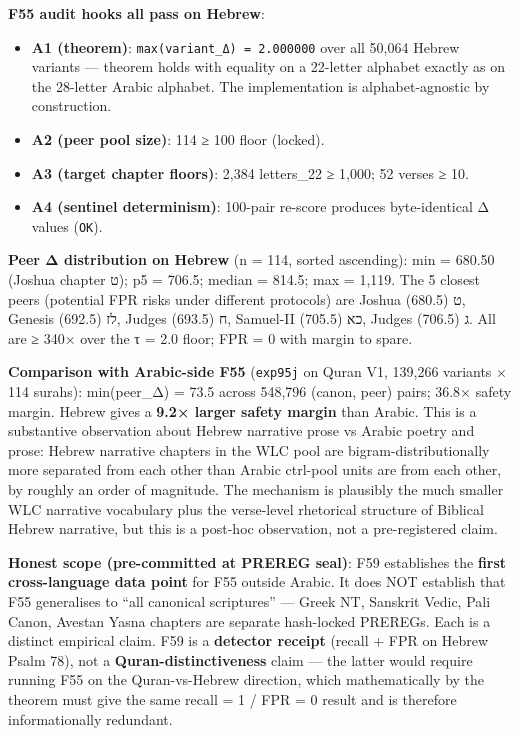 \documentclass[
]{article}
\providecommand{\tightlist}{%
  \setlength{\itemsep}{0pt}\setlength{\parskip}{0pt}}
\begin{document}
\textbf{F55 audit hooks all pass on Hebrew}:

\begin{itemize}
\tightlist
\item
  \textbf{A1 (theorem)}: \texttt{max(variant\_Δ)\ =\ 2.000000} over all
  50,064 Hebrew variants --- theorem holds with equality on a 22-letter
  alphabet exactly as on the 28-letter Arabic alphabet. The
  implementation is alphabet-agnostic by construction.
\item
  \textbf{A2 (peer pool size)}: 114 ≥ 100 floor (locked).
\item
  \textbf{A3 (target chapter floors)}: 2,384 letters\_22 ≥ 1,000; 52
  verses ≥ 10.
\item
  \textbf{A4 (sentinel determinism)}: 100-pair re-score produces
  byte-identical Δ values (\texttt{OK}).
\end{itemize}

\textbf{Peer Δ distribution on Hebrew} (n = 114, sorted ascending): min
= 680.50 (Joshua chapter ט); p5 = 706.5; median = 814.5; max = 1,119.
The 5 closest peers (potential FPR risks under different protocols) are
Joshua ט (680.5), Genesis לז (692.5), Judges ח (693.5), Samuel-II כא
(705.5), Judges ג (706.5). All are ≥ 340× over the τ = 2.0 floor; FPR =
0 with margin to spare.

\textbf{Comparison with Arabic-side F55} (\texttt{exp95j} on Quran V1,
139,266 variants × 114 surahs): min(peer\_Δ) = 73.5 across 548,796
(canon, peer) pairs; 36.8× safety margin. Hebrew gives a \textbf{9.2×
larger safety margin} than Arabic. This is a substantive observation
about Hebrew narrative prose vs Arabic poetry and prose: Hebrew
narrative chapters in the WLC pool are bigram-distributionally more
separated from each other than Arabic ctrl-pool units are from each
other, by roughly an order of magnitude. The mechanism is plausibly the
much smaller WLC narrative vocabulary plus the verse-level rhetorical
structure of Biblical Hebrew narrative, but this is a post-hoc
observation, not a pre-registered claim.

\textbf{Honest scope (pre-committed at PREREG seal)}: F59 establishes
the \textbf{first cross-language data point} for F55 outside Arabic. It
does NOT establish that F55 generalises to ``all canonical scriptures''
--- Greek NT, Sanskrit Vedic, Pali Canon, Avestan Yasna chapters are
separate hash-locked PREREGs. Each is a distinct empirical claim. F59 is
a \textbf{detector receipt} (recall + FPR on Hebrew Psalm 78), not a
\textbf{Quran-distinctiveness} claim --- the latter would require
running F55 on the Quran-vs-Hebrew direction, which mathematically by
the theorem must give the same recall = 1 / FPR = 0 result and is
therefore informationally redundant.
\end{document}
